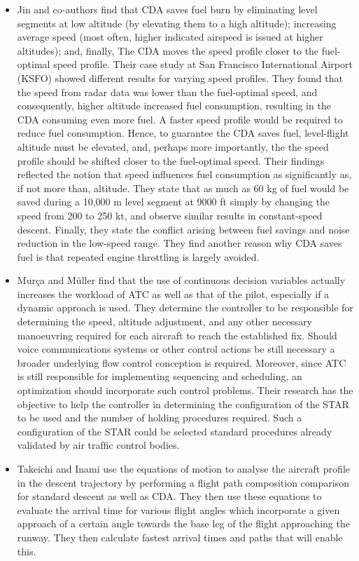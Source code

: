 \documentclass{aer1315-pretty}
\begin{document}
\begin{itemize}
\item Jin and co-authors \cite{Jin:2013} find that CDA saves fuel burn by eliminating level segments at low altitude (by elevating them to a high altitude); increasing average speed (most often, higher indicated airspeed is issued at higher altitudes); and, finally, The CDA moves the speed profile closer to the fuel-optimal speed profile. Their case study at San Francisco International Airport (KSFO) showed different results for varying speed profiles. 
They found that the speed from radar data was lower than the fuel-optimal speed, and consequently, higher altitude increased fuel consumption, resulting in the CDA consuming even more fuel. A faster speed profile would be required to reduce fuel consumption. Hence, to guarantee the CDA saves fuel, level-flight altitude must be elevated, and, perhaps more importantly, the the speed profile should be shifted closer to the fuel-optimal speed. Their findings reflected the notion that speed influences fuel consumption as significantly as, if not more than, altitude. They state that as much as 60 kg of fuel would be saved during a 10,000 m level segment at 9000 ft simply by changing the speed from 200 to 250 kt, and observe similar results in constant-speed descent.
Finally, they state the conflict arising between fuel savings and noise reduction in the low-speed range. They find another reason why CDA saves fuel is that repeated engine throttling is largely avoided.

\item Mur\c{c}a and M{\"u}ller \cite{Murca:2015} find that the use of continuous decision variables actually increases the workload of ATC as well as that of the pilot, especially if a dynamic approach is used. They determine the controller to be responsible for determining the speed, altitude adjustment, and any other necessary manoeuvring required for each aircraft to reach the established fix. Should voice communications systems or other control actions be still necessary a broader underlying flow control conception is required. Moreover, since ATC is still responsible for implementing sequencing and scheduling, an optimization should incorporate such control problems. Their research has the objective to help the controller in determining the configuration of the STAR to be used and the number of holding procedures required. Such a conﬁguration of the STAR could be selected standard procedures already validated by air trafﬁc control bodies. 

\item Takeichi and Inami \cite{Takeichi:2010} use the equations of motion to analyse the aircraft profile in the descent trajectory by performing a flight path composition comparison for standard descent as well as CDA. They then use these equations to evaluate the arrival time for various flight angles which incorporate a given approach of a certain angle towards the base leg of the flight approaching the runway. They then calculate fastest arrival times and paths that will enable this.


\end{itemize}
\end{document}
